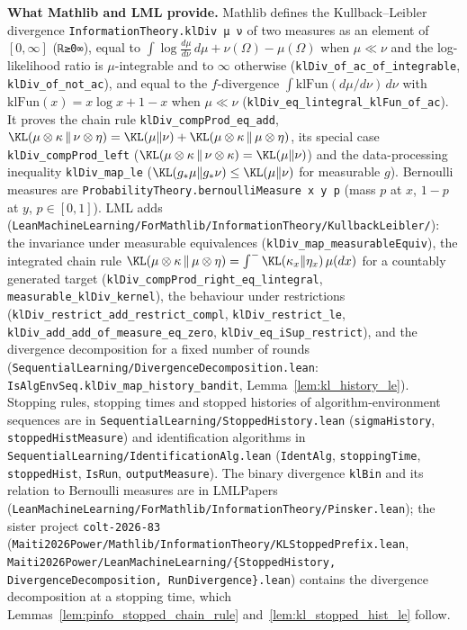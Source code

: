 \textbf{What Mathlib and LML provide.} Mathlib defines the Kullback--Leibler divergence
\texttt{InformationTheory.klDiv μ ν} of two measures as an element of $[0, \infty]$
(\texttt{ℝ≥0∞}), equal to $\int \log\frac{d\mu}{d\nu}\,d\mu + \nu(\Omega) - \mu(\Omega)$ when
$\mu \ll \nu$ and the log-likelihood ratio is $\mu$-integrable and to $\infty$ otherwise
(\texttt{klDiv\_of\_ac\_of\_integrable}, \texttt{klDiv\_of\_not\_ac}), and equal to the
$f$-divergence $\int \mathrm{klFun}(d\mu/d\nu)\,d\nu$ with $\mathrm{klFun}(x) = x\log x + 1 - x$
when $\mu \ll \nu$ (\texttt{klDiv\_eq\_lintegral\_klFun\_of\_ac}). It proves the chain rule
\texttt{klDiv\_compProd\_eq\_add}, $\KL(\mu\otimes\kappa\,\|\,\nu\otimes\eta) = \KL(\mu\|\nu) +
\KL(\mu\otimes\kappa\,\|\,\mu\otimes\eta)$, its special case \texttt{klDiv\_compProd\_left}
($\KL(\mu\otimes\kappa\,\|\,\nu\otimes\kappa) = \KL(\mu\|\nu)$) and the data-processing
inequality \texttt{klDiv\_map\_le} ($\KL(g_*\mu\|g_*\nu) \le \KL(\mu\|\nu)$ for measurable $g$).
Bernoulli measures are \texttt{ProbabilityTheory.bernoulliMeasure x y p} (mass $p$ at $x$,
$1 - p$ at $y$, $p \in [0,1]$). LML adds
(\texttt{LeanMachineLearning/ForMathlib/InformationTheory/KullbackLeibler/}): the invariance
under measurable equivalences (\texttt{klDiv\_map\_measurableEquiv}), the integrated chain rule
$\KL(\mu\otimes\kappa\,\|\,\mu\otimes\eta) = \int^- \KL(\kappa_x\|\eta_x)\,\mu(dx)$ for a countably
generated target (\texttt{klDiv\_compProd\_right\_eq\_lintegral},
\texttt{measurable\_klDiv\_kernel}), the behaviour under restrictions
(\texttt{klDiv\_restrict\_add\_restrict\_compl}, \texttt{klDiv\_restrict\_le},
\texttt{klDiv\_add\_add\_of\_measure\_eq\_zero}, \texttt{klDiv\_eq\_iSup\_restrict}), and the
divergence decomposition for a fixed number of rounds
(\texttt{SequentialLearning/DivergenceDecomposition.lean}:
\texttt{IsAlgEnvSeq.klDiv\_map\_history\_bandit}, Lemma~\ref{lem:kl_history_le}). Stopping rules,
stopping times and stopped histories of algorithm-environment sequences are in
\texttt{SequentialLearning/StoppedHistory.lean} (\texttt{sigmaHistory},
\texttt{stoppedHistMeasure}) and identification algorithms in
\texttt{SequentialLearning/IdentificationAlg.lean} (\texttt{IdentAlg}, \texttt{stoppingTime},
\texttt{stoppedHist}, \texttt{IsRun}, \texttt{outputMeasure}). The binary divergence
\texttt{klBin} and its relation to Bernoulli measures are in LMLPapers
(\texttt{LeanMachineLearning/ForMathlib/InformationTheory/Pinsker.lean}); the sister project
\texttt{colt-2026-83} (\texttt{Maiti2026Power/Mathlib/InformationTheory/KLStoppedPrefix.lean},
\texttt{Maiti2026Power/LeanMachineLearning/\{StoppedHistory, DivergenceDecomposition,
RunDivergence\}.lean}) contains the divergence decomposition at a stopping time, which
Lemmas~\ref{lem:pinfo_stopped_chain_rule} and~\ref{lem:kl_stopped_hist_le} follow.

